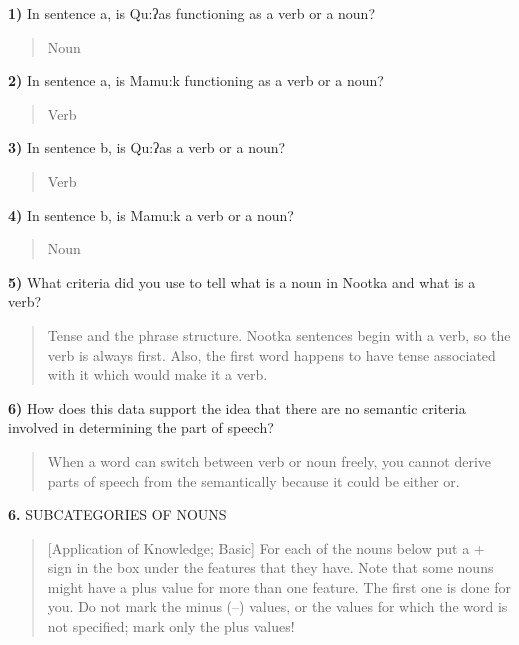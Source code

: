 \documentclass[11pt,notitlepage]{article}
\newcommand{\question}[2]{\textbf{#1.} #2}
\newcommand{\subquestion}[2]{\par\hspace{0.5cm} \textbf{#1)} #2}
\begin{document}
\subquestion{1}{In sentence a, is Qu:ʔas functioning as a verb or a
  noun?}

\begin{quote}
  Noun
\end{quote}

\subquestion{2}{In sentence a, is Mamu:k functioning as a verb or a
  noun?}

\begin{quote}
  Verb
\end{quote}

\subquestion{3}{In sentence b, is Qu:ʔas a verb or a noun?}

\begin{quote}
Verb
\end{quote}

\subquestion{4}In sentence b, is Mamu:k a verb or a noun?

\begin{quote}
  Noun
\end{quote}

\subquestion{5}{What criteria did you use to tell what is a noun in Nootka and what is a
verb?}

\begin{quote}
  Tense and the phrase structure. Nootka sentences begin with a verb,
  so the verb is always first. Also, the first word happens to have
  tense associated with it which would make it a verb.
\end{quote}

\subquestion{6}{How does this data support the idea that there are no semantic criteria
involved in determining the part of speech?}

\begin{quote}
  When a word can switch between verb or noun freely, you cannot
  derive parts of speech from the semantically because it could be
  either or.
\end{quote}

\question{6}{SUBCATEGORIES OF NOUNS}
\begin{quote}[Application of Knowledge; Basic]
For each of the nouns below put a + sign in the box under the features
that they have. Note that some nouns might have a plus value for more
than one feature. The first one is done for you. Do not mark the minus
(–) values, or the values for which the word is not specified; mark
only the plus values!\end{quote}
\end{document}
